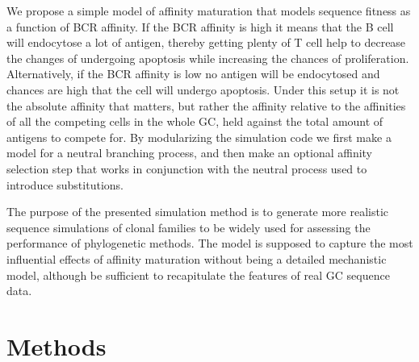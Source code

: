 We propose a simple model of affinity maturation that models sequence fitness as a function of BCR affinity.
If the BCR affinity is high it means that the B cell will endocytose a lot of antigen, thereby getting plenty of T cell help to decrease the changes of undergoing apoptosis while increasing the chances of proliferation.
Alternatively, if the BCR affinity is low no antigen will be endocytosed and chances are high that the cell will undergo apoptosis.
Under this setup it is not the absolute affinity that matters, but rather the affinity relative to the affinities of all the competing cells in the whole GC, held against the total amount of antigens to compete for.
By modularizing the simulation code we first make a model for a neutral branching process, and then make an optional affinity selection step that works in conjunction with the neutral process used to introduce substitutions.

The purpose of the presented simulation method is to generate more realistic sequence simulations of clonal families to be widely used for assessing the performance of phylogenetic methods.
The model is supposed to capture the most influential effects of affinity maturation without being a detailed mechanistic model, although be sufficient to recapitulate the features of real GC sequence data.






\section{Methods}

